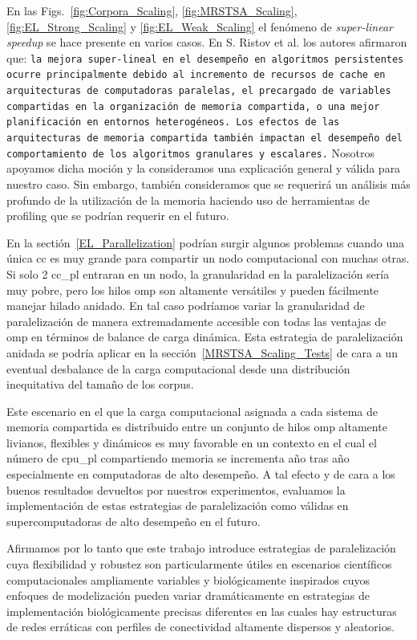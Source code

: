 {En las Figs.~\ref{fig:Corpora_Scaling}, \ref{fig:MRSTSA_Scaling}, \ref{fig:EL_Strong_Scaling} y \ref{fig:EL_Weak_Scaling} el fenómeno de \emph{super-linear speedup} se hace presente en varios casos.
En S. Ristov et al. \cite{7733347} los autores afirmaron que: \texttt{la mejora super-lineal en el desempeño en algoritmos persistentes ocurre principalmente debido al incremento de recursos de cache en arquitecturas de computadoras paralelas, el precargado de variables compartidas en la organización de memoria compartida, o una mejor planificación en entornos heterogéneos.
Los efectos de las arquitecturas de memoria compartida también impactan el desempeño del comportamiento de los algoritmos granulares y escalares.}
Nosotros apoyamos dicha moción y la consideramos una explicación general y válida para nuestro caso. Sin embargo, también consideramos que se requerirá un análisis más profundo de la utilización de la memoria haciendo uso de herramientas de profiling que se podrían requerir en el futuro.

En la sectión~\ref{EL_Parallelization} podrían surgir algunos problemas cuando una única \gls{cc} es muy grande para compartir un nodo computacional con muchas otras.
Si solo 2 \gls{cc_pl} entraran en un nodo, la granularidad en la paralelización sería muy pobre, pero los hilos \gls{omp} son altamente versátiles y pueden fácilmente  manejar hilado anidado.
En tal caso podríamos variar la granularidad de paralelización de manera extremadamente accesible con todas las ventajas de \gls{omp} en términos de balance de carga dinámica.
Esta estrategia de paralelización anidada se podría aplicar en la sección~\ref{MRSTSA_Scaling_Tests} de cara a un eventual desbalance de la carga computacional desde una distribución inequitativa del tamaño de los corpus.

Este escenario en el que la carga computacional asignada a cada sistema de memoria compartida es distribuido entre un conjunto de hilos \gls{omp} altamente livianos, flexibles y dinámicos es muy favorable en un contexto en el cual el número de \gls{cpu_pl} compartiendo memoria se incrementa año tras año especialmente en computadoras de alto desempeño.
A tal efecto y de cara a los buenos resultados devueltos por nuestros experimentos, evaluamos la implementación de estas estrategias de paralelización como válidas en supercomputadoras de alto desempeño en el futuro.

Afirmamos por lo tanto que este trabajo introduce estrategias de paralelización cuya flexibilidad y robustez son particularmente útiles en escenarios científicos computacionales ampliamente variables y biológicamente inspirados cuyos enfoques de modelización pueden variar dramáticamente en estrategias de implementación biológicamente precisas diferentes en las cuales hay estructuras de redes erráticas con perfiles de conectividad altamente dispersos y aleatorios.
}{
}
